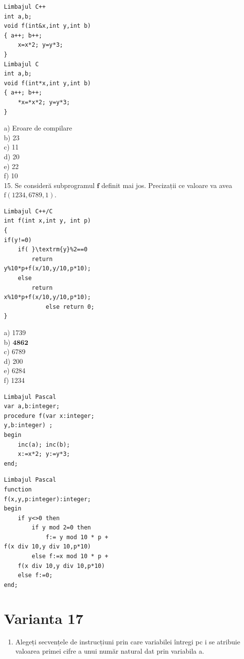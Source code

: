\documentclass[10pt]{article}
\begin{document}
\begin{verbatim}
Limbajul C++
int a,b;
void f(int&x,int y,int b)
{ a++; b++;
    x=x*2; y=y*3;
}
Limbajul C
int a,b;
void f(int*x,int y,int b)
{ a++; b++;
    *x=*x*2; y=y*3;
}
\end{verbatim}

a) Eroare de compilare\\
b) 23\\
c) 11\\
d) 20\\
e) 22\\
f) 10\\
15. Se consideră subprogramul $\mathbf{f}$ definit mai jos. Precizații ce valoare va avea $\mathrm{f}(1234,6789,1)$.

\begin{verbatim}
Limbajul C++/C
int f(int x,int y, int p)
{
if(y!=0)
    if( }\textrm{y}%2==0
        return
y%10*p+f(x/10,y/10,p*10);
    else
        return
x%10*p+f(x/10,y/10,p*10);
            else return 0;
}
\end{verbatim}

a) 1739\\
b) $\mathbf{4 8 6 2}$\\
c) 6789\\
d) 200\\
e) 6284\\
f) 1234

\begin{verbatim}
Limbajul Pascal
var a,b:integer;
procedure f(var x:integer;
y,b:integer) ;
begin
    inc(a); inc(b);
    x:=x*2; y:=y*3;
end;
\end{verbatim}

\begin{verbatim}
Limbajul Pascal
function
f(x,y,p:integer):integer;
begin
    if y<>0 then
        if y mod 2=0 then
            f:= y mod 10 * p +
f(x div 10,y div 10,p*10)
        else f:=x mod 10 * p +
    f(x div 10,y div 10,p*10)
    else f:=0;
end;
\end{verbatim}

\section*{Varianta 17}
\begin{enumerate}
  \item Alegeți secvențele de instrucțiuni prin care variabilei întregi pc i se atribuie valoarea primei cifre a unui număr natural dat prin variabila a.
\end{enumerate}
\end{document}
